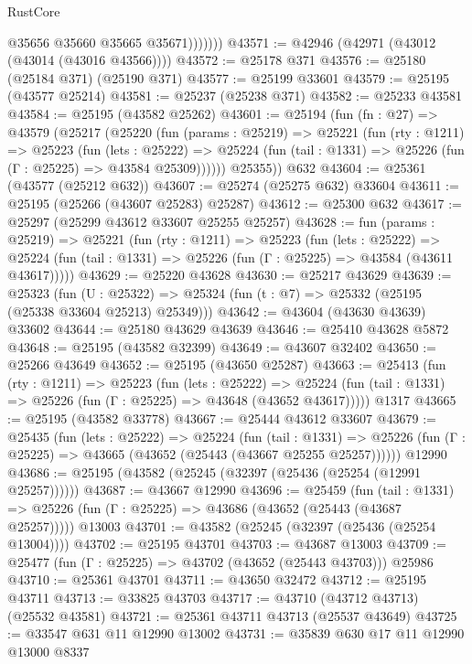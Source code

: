 \begin{lexlean}{RustCore}
\begin{coremodule}
                  @35656
                  @35660
                  @35665
                  @35671)))))))
@43571 := @42946 (@42971 (@43012 (@43014 (@43016 @43566))))
@43572 := @25178 @371
@43576 := @25180 (@25184 @371) (@25190 @371)
@43577 := @25199 @33601
@43579 := @25195 (@43577 @25214)
@43581 := @25237 (@25238 @371)
@43582 := @25233 @43581
@43584 := @25195 (@43582 @25262)
@43601 := @25194
    (fun (fn : @27) =>
    @43579
      (@25217
        (@25220
          (fun (params : @25219) =>
          @25221
            (fun (rty : @1211) =>
            @25223
              (fun (lets : @25222) =>
              @25224 (fun (tail : @1331) => @25226 (fun (Γ : @25225) => @43584 @25309))))))
        @25355))
    @632
@43604 := @25361 (@43577 (@25212 @632))
@43607 := @25274 (@25275 @632) @33604
@43611 := @25195 (@25266 (@43607 @25283) @25287)
@43612 := @25300 @632
@43617 := @25297 (@25299 @43612 @33607 @25255 @25257)
@43628 := fun (params : @25219) =>
  @25221
    (fun (rty : @1211) =>
    @25223
      (fun (lets : @25222) =>
      @25224 (fun (tail : @1331) => @25226 (fun (Γ : @25225) => @43584 (@43611 @43617)))))
@43629 := @25220 @43628
@43630 := @25217 @43629
@43639 := @25323
    (fun (U : @25322) => @25324 (fun (t : @7) => @25332 (@25195 (@25338 @33604 @25213) @25349)))
@43642 := @43604 (@43630 @43639) @33602
@43644 := @25180 @43629 @43639
@43646 := @25410 @43628 @5872
@43648 := @25195 (@43582 @32399)
@43649 := @43607 @32402
@43650 := @25266 @43649
@43652 := @25195 (@43650 @25287)
@43663 := @25413
    (fun (rty : @1211) =>
    @25223
      (fun (lets : @25222) =>
      @25224 (fun (tail : @1331) => @25226 (fun (Γ : @25225) => @43648 (@43652 @43617)))))
    @1317
@43665 := @25195 (@43582 @33778)
@43667 := @25444 @43612 @33607
@43679 := @25435
    (fun (lets : @25222) =>
    @25224
      (fun (tail : @1331) =>
      @25226 (fun (Γ : @25225) => @43665 (@43652 (@25443 (@43667 @25255 @25257))))))
    @12990
@43686 := @25195 (@43582 (@25245 (@32397 (@25436 (@25254 (@12991 @25257))))))
@43687 := @43667 @12990
@43696 := @25459
    (fun (tail : @1331) => @25226 (fun (Γ : @25225) => @43686 (@43652 (@25443 (@43687 @25257)))))
    @13003
@43701 := @43582 (@25245 (@32397 (@25436 (@25254 @13004))))
@43702 := @25195 @43701
@43703 := @43687 @13003
@43709 := @25477 (fun (Γ : @25225) => @43702 (@43652 (@25443 @43703))) @25986
@43710 := @25361 @43701
@43711 := @43650 @32472
@43712 := @25195 @43711
@43713 := @33825 @43703
@43717 := @43710 (@43712 @43713) (@25532 @43581)
@43721 := @25361 @43711 @43713 (@25537 @43649)
@43725 := @33547 @631 @11 @12990 @13002
@43731 := @35839 @630 @17 @11 @12990 @13000 @8337

\end{coremodule}
\end{lexlean}
